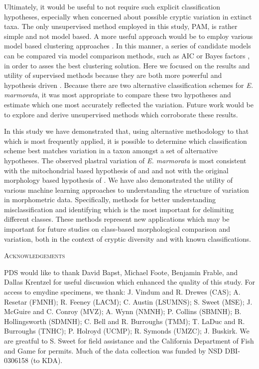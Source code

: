\documentclass[12pt,letterpaper]{article}\usepackage{graphicx, color}
\renewcommand{\section}[1]{%
\bigskip
\begin{center}
\begin{Large}
\normalfont\scshape #1
\medskip
\end{Large}
\end{center}}
\begin{document}
Ultimately, it would be useful to not require such explicit classification hypotheses, especially when concerned about possible cryptic variation in extinct taxa. The only unsupervised method employed in this study, PAM, is rather simple and not model based. A more useful approach would be to employ various model based clustering approaches \citep{Fraley2002,Zhong2003}. In this manner, a series of candidate models can be compared via model comparison methods, such as AIC or Bayes factors \citep{Fraley2002}, in order to asses the best clustering solution. %
Here we focused on the results and utility of supervised methods because they are both more powerful and hypothesis driven \citep{Hastie2009}. Because there are two alternative classification schemes for \textit{E. marmorata}, it was most appropriate to compare these two hypotheses and estimate which one most accurately reflected the variation. Future work would be to explore and derive unsupervised methods which corroborate these results.

In this study we have demonstrated that, using alternative methodology to that which is most frequently applied, it is possible to determine which classification scheme best matches variation in a taxon amongst a set of alternative hypotheses. The observed plastral variation of \textit{E. marmorata} is most consistent with the mitochondrial based hypothesis of \citet{Spinks2005} and \citet{Spinks2010} and not with the original morphology based hypothesis of \citet{Seeliger1945,Holland1992}. We have also demonstrated the utility of various machine learning approaches to understanding the structure of variation in morphometric data. Specifically, methods for better understanding misclassification and identifying which is the most important for delimiting different classes. These methods represent new applications which may be important for future studies on class-based morphological comparison and variation, both in the context of cryptic diversity and with known classifications.

\section{Acknowledgements}
PDS would like to thank David Bapst, Michael Foote, Benjamin Frable, and Dallas Krentzel for useful discussion which enhanced the quality of this study. For access to emydine specimens, we thank: J. Vindum and R. Drewes (CAS); A. Resetar (FMNH); R. Feeney (LACM); C. Austin (LSUMNS); S. Sweet (MSE); J. McGuire and C. Conroy (MVZ); A. Wynn (NMNH); P. Collins (SBMNH); B. Hollingsworth (SDMNH); C. Bell and R. Burroughs (TMM); T. LaDuc and R. Burroughs (TNHC); P. Holroyd (UCMP); R. Symonds (UMZC); J. Buskirk. We are greatful to S. Sweet for field assistance and the California Department of Fish and Game for permits. Much of the data collection was funded by NSD DBI-0306158 (to KDA).
\end{document}
